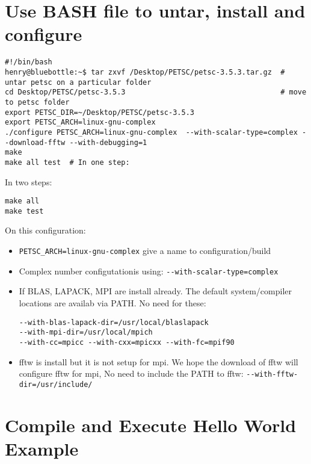 \documentclass{article}
\begin{document}
\section{Use BASH file to untar, install and configure}
\begin{verbatim}
#!/bin/bash
henry@bluebottle:~$ tar zxvf /Desktop/PETSC/petsc-3.5.3.tar.gz  # untar petsc on a particular folder
cd Desktop/PETSC/petsc-3.5.3                                    # move to petsc folder
export PETSC_DIR=~/Desktop/PETSC/petsc-3.5.3
export PETSC_ARCH=linux-gnu-complex
./configure PETSC_ARCH=linux-gnu-complex  --with-scalar-type=complex --download-fftw --with-debugging=1
make
make all test  # In one step:
\end{verbatim}
In two steps:
\begin{verbatim}
make all
make test
\end{verbatim}
On this configuration:
\begin{itemize}
\item \verb+PETSC_ARCH=linux-gnu-complex+ give a name to configuration/build
\item Complex number configutationis using: \verb+--with-scalar-type=complex+
\item If BLAS, LAPACK, MPI are install already. The default system/compiler locations are availab via PATH. No need for these:  
\begin{verbatim}
--with-blas-lapack-dir=/usr/local/blaslapack
--with-mpi-dir=/usr/local/mpich
--with-cc=mpicc --with-cxx=mpicxx --with-fc=mpif90
\end{verbatim}
\item fftw is install but it is not setup for mpi. We hope the download of fftw will configure fftw for mpi, No need to include the PATH to fftw: \verb+--with-fftw-dir=/usr/include/+ 
\end{itemize}

\section{Compile and Execute Hello World Example}
\end{document}
